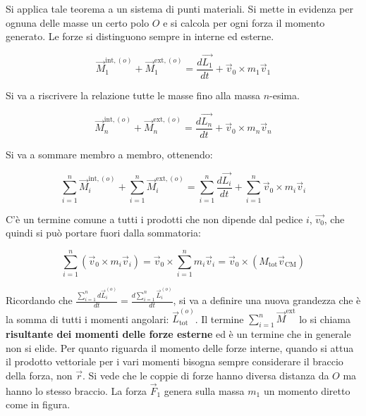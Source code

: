 \begin{figure}[htpb]
\end{figure}
\FloatBarrier
Si applica tale teorema a un sistema di punti materiali. Si mette in evidenza per ognuna delle masse un certo polo $O$ e si calcola per ogni forza il momento generato. Le forze si distinguono sempre in interne ed esterne.

\[
	\vec{M}_1^{\text{int}, (o)}+\vec{M}_1^{\text{ext}, (o)}=\frac{d\vec{L_1}}{dt}+\vec{v}_0\times m_1\vec{v}_1
\]

Si va a riscrivere la relazione tutte le masse fino alla massa $n$-esima.

\[
	\vec{M}_n^{\text{int}, (o)}+\vec{M}_n^{\text{ext}, (o)}=\frac{d\vec{L_n}}{dt}+\vec{v}_0\times m_n\vec{v}_n
\]

Si va a sommare membro a membro, ottenendo:

\[
	\sum_{i=1}^n \vec{M}_i^{\text{int}, (o)}+\sum_{i=1}^n \vec{M}_i^{\text{ext}, (o)}=\sum_{i=1}^n \frac{d\vec{L_i}}{dt}+\sum_{i=1}^n \vec{v}_0\times m_i\vec{v}_i
\]

C'è un termine comune a tutti i prodotti che non dipende dal pedice $i$, $\vec{v_0}$, che quindi si può portare fuori dalla sommatoria:

\begin{equation}
	\label{ciao}
	\sum_{i=1}^n(\vec{v}_0\times m_i\vec{v}_i)=\vec{v}_0 \times \sum_{i=1}^nm_i\vec{v}_i=\vec{v}_0\times (M_\text{tot}\vec{v}_\text{CM})
\end{equation}

Ricordando che $\frac{\sum_{i=1}^nd\vec{L}_i^{(o)}}{dt}=\frac{d\sum_{i=1}^n \vec{L}_i^{(o)}}{dt}$, si va a definire una nuova grandezza che è la somma di tutti i momenti angolari: $\vec{L}_\text{tot}^{(o)}$.
Il termine $\sum_{i=1}^n \vec{M}^\text{ext}$ lo si chiama \textbf{risultante dei momenti delle forze esterne} ed è un termine che in generale non si elide. Per quanto riguarda il momento delle forze interne, quando si attua il prodotto vettoriale per i vari momenti bisogna sempre considerare il braccio della forza, non $\vec{r}$. Si vede che le coppie di forze hanno diversa distanza da $O$ ma hanno lo stesso braccio. La forza $\vec{F}_1$ genera sulla massa $m_1$ un momento diretto come in figura.


